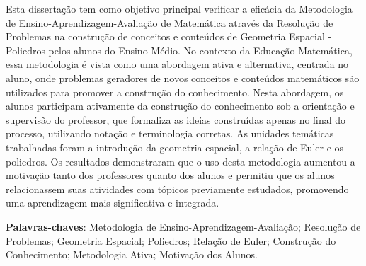 
\setlength{\absparsep}{18pt} %
\begin{resumo}
    Esta dissertação tem como objetivo principal verificar a eficácia da Metodologia de Ensino-Aprendizagem-Avaliação de Matemática através da Resolução de Problemas na construção de conceitos e conteúdos de Geometria Espacial - Poliedros pelos alunos do Ensino Médio. No contexto da Educação Matemática, essa metodologia é vista como uma abordagem ativa e alternativa, centrada no aluno, onde problemas geradores de novos conceitos e conteúdos matemáticos são utilizados para promover a construção do conhecimento. Nesta abordagem, os alunos participam ativamente da construção do conhecimento sob a orientação e supervisão do professor, que formaliza as ideias construídas apenas no final do processo, utilizando notação e terminologia corretas. As unidades temáticas trabalhadas foram a introdução da geometria espacial, a relação de Euler e os poliedros. Os resultados demonstraram que o uso desta metodologia aumentou a motivação tanto dos professores quanto dos alunos e permitiu que os alunos relacionassem suas atividades com tópicos previamente estudados, promovendo uma aprendizagem mais significativa e integrada.
 
    \textbf{Palavras-chaves}:  Metodologia de Ensino-Aprendizagem-Avaliação; Resolução de Problemas; Geometria Espacial; Poliedros; Relação de Euler; Construção do Conhecimento; Metodologia Ativa; Motivação dos Alunos.

\end{resumo}

